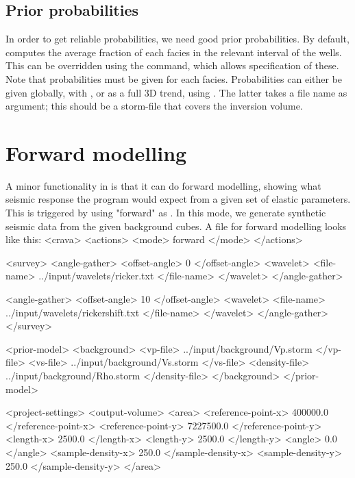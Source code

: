 \subsection{Prior probabilities}
In order to get reliable probabilities, we need good prior probabilities. By default, \crava computes the average fraction of each facies in the relevant interval of the wells. This can be overridden using the  command, which allows specification of these. Note that probabilities must be given for each facies. Probabilities can either be given globally, with , or as a full 3D trend, using . The latter takes a file name as argument; this should be a storm-file that covers the inversion volume.

\section{Forward modelling}
\label{sec:forwardusr}
A minor functionality in \crava is that it can do forward modelling, showing what seismic response the program would expect from a given set of elastic parameters. This is triggered by using "forward" as . In this mode, we generate synthetic seismic data from the given background cubes. A file for forward modelling looks like this:
<crava>
<actions>
  <mode> forward </mode>
</actions>

<survey>
  <angle-gather>
    <offset-angle>  0 </offset-angle>
    <wavelet>
      <file-name> ../input/wavelets/ricker.txt      </file-name>
    </wavelet>
  </angle-gather>

  <angle-gather>
    <offset-angle> 10 </offset-angle>
    <wavelet>
      <file-name> ../input/wavelets/rickershift.txt </file-name>
    </wavelet>
  </angle-gather>
</survey>

<prior-model>
  <background>
    <vp-file>      ../input/background/Vp.storm  </vp-file>
    <vs-file>      ../input/background/Vs.storm  </vs-file>
    <density-file> ../input/background/Rho.storm </density-file>
  </background>
</prior-model>

<project-settings>
  <output-volume>
    <area>
      <reference-point-x>  400000.0 </reference-point-x>
      <reference-point-y> 7227500.0 </reference-point-y>
      <length-x>             2500.0 </length-x>
      <length-y>             2500.0 </length-y>
      <angle>                   0.0 </angle>
      <sample-density-x>      250.0 </sample-density-x>
      <sample-density-y>      250.0 </sample-density-y>
    </area>

